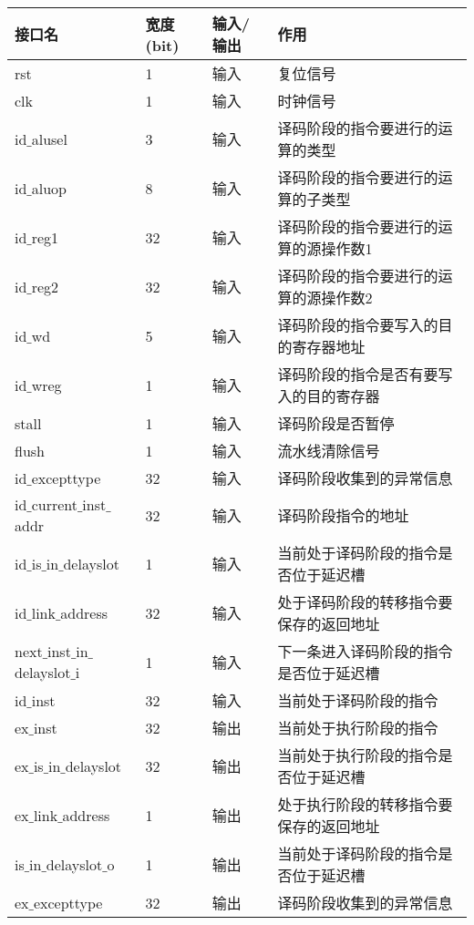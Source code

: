 \quad
	\begin{longtable}{|l|l|l|l|}
		\hline
		接口名 & 宽度(bit) & 输入/输出 & 作用 \\
		\hline
		rst & 1 & 输入 & 复位信号 \\
		\hline
		clk & 1 & 输入 & 时钟信号 \\
		\hline
		id$\_$alusel & 3 & 输入 & 译码阶段的指令要进行的运算的类型 \\
		\hline
		id$\_$aluop & 8 & 输入 & 译码阶段的指令要进行的运算的子类型 \\
		\hline
		id$\_$reg1 & 32 & 输入 & 译码阶段的指令要进行的运算的源操作数1 \\
		\hline
		id$\_$reg2 & 32 & 输入 & 译码阶段的指令要进行的运算的源操作数2 \\
		\hline
		id$\_$wd & 5 & 输入 & 译码阶段的指令要写入的目的寄存器地址 \\
		\hline
		id$\_$wreg & 1 & 输入 & 译码阶段的指令是否有要写入的目的寄存器 \\
		\hline
		stall & 1 & 输入 & 译码阶段是否暂停 \\
		\hline
		flush & 1 & 输入 & 流水线清除信号 \\
		\hline
		id$\_$excepttype & 32 & 输入 & 译码阶段收集到的异常信息 \\
		\hline
		id$\_$current$\_$inst$\_$addr & 32 & 输入 & 译码阶段指令的地址 \\
		\hline
		id$\_$is$\_$in$\_$delayslot & 1 & 输入 & 当前处于译码阶段的指令是否位于延迟槽 \\
		\hline
		id$\_$link$\_$address & 32 & 输入 & 处于译码阶段的转移指令要保存的返回地址 \\
		\hline
		next$\_$inst$\_$in$\_$delayslot$\_$i & 1 & 输入 & 下一条进入译码阶段的指令是否位于延迟槽 \\
		\hline
		id$\_$inst & 32 & 输入 & 当前处于译码阶段的指令 \\
		\hline
		ex$\_$inst & 32 & 输出 & 当前处于执行阶段的指令 \\
		\hline
		ex$\_$is$\_$in$\_$delayslot & 32 & 输出 & 当前处于执行阶段的指令是否位于延迟槽 \\
		\hline
		ex$\_$link$\_$address & 1 & 输出 & 处于执行阶段的转移指令要保存的返回地址 \\
		\hline
		is$\_$in$\_$delayslot$\_$o & 1 & 输出 & 当前处于译码阶段的指令是否位于延迟槽 \\
		\hline
		ex$\_$excepttype & 32 & 输出 & 译码阶段收集到的异常信息 \\

\end{longtable}

